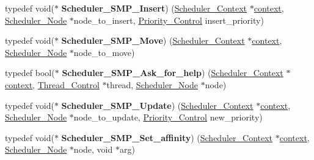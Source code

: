 \begin{DoxyCompactItemize}
typedef void($\ast$ {\bfseries Scheduler\+\_\+\+S\+M\+P\+\_\+\+Insert}) (\mbox{\hyperlink{structScheduler__Context}{Scheduler\+\_\+\+Context}} $\ast$\mbox{\hyperlink{sun4u_2tte_8h_a9b4a99475e2709333b8e5d70483173f1}{context}}, \mbox{\hyperlink{structScheduler__Node}{Scheduler\+\_\+\+Node}} $\ast$node\+\_\+to\+\_\+insert, \mbox{\hyperlink{group__RTEMSScorePriority_ga59d02b58072d31a9a1cfe644557aefe2}{Priority\+\_\+\+Control}} insert\+\_\+priority)
\item 
\mbox{\label{group__RTEMSScoreSchedulerSMP_gafd858381d71652bf4544edd5720ee9bb}} 
typedef void($\ast$ {\bfseries Scheduler\+\_\+\+S\+M\+P\+\_\+\+Move}) (\mbox{\hyperlink{structScheduler__Context}{Scheduler\+\_\+\+Context}} $\ast$\mbox{\hyperlink{sun4u_2tte_8h_a9b4a99475e2709333b8e5d70483173f1}{context}}, \mbox{\hyperlink{structScheduler__Node}{Scheduler\+\_\+\+Node}} $\ast$node\+\_\+to\+\_\+move)
\item 
\mbox{\label{group__RTEMSScoreSchedulerSMP_gab1c70b4d168f72f16900e2aa9deff2c6}} 
typedef bool($\ast$ {\bfseries Scheduler\+\_\+\+S\+M\+P\+\_\+\+Ask\+\_\+for\+\_\+help}) (\mbox{\hyperlink{structScheduler__Context}{Scheduler\+\_\+\+Context}} $\ast$\mbox{\hyperlink{sun4u_2tte_8h_a9b4a99475e2709333b8e5d70483173f1}{context}}, \mbox{\hyperlink{struct__Thread__Control}{Thread\+\_\+\+Control}} $\ast$thread, \mbox{\hyperlink{structScheduler__Node}{Scheduler\+\_\+\+Node}} $\ast$node)
\item 
\mbox{\label{group__RTEMSScoreSchedulerSMP_ga1521798609968da561928c34daeb8010}} 
typedef void($\ast$ {\bfseries Scheduler\+\_\+\+S\+M\+P\+\_\+\+Update}) (\mbox{\hyperlink{structScheduler__Context}{Scheduler\+\_\+\+Context}} $\ast$\mbox{\hyperlink{sun4u_2tte_8h_a9b4a99475e2709333b8e5d70483173f1}{context}}, \mbox{\hyperlink{structScheduler__Node}{Scheduler\+\_\+\+Node}} $\ast$node\+\_\+to\+\_\+update, \mbox{\hyperlink{group__RTEMSScorePriority_ga59d02b58072d31a9a1cfe644557aefe2}{Priority\+\_\+\+Control}} new\+\_\+priority)
\item 
\mbox{\label{group__RTEMSScoreSchedulerSMP_ga4bd9696c86228b495ea5569708e9850b}} 
typedef void($\ast$ {\bfseries Scheduler\+\_\+\+S\+M\+P\+\_\+\+Set\+\_\+affinity}) (\mbox{\hyperlink{structScheduler__Context}{Scheduler\+\_\+\+Context}} $\ast$\mbox{\hyperlink{sun4u_2tte_8h_a9b4a99475e2709333b8e5d70483173f1}{context}}, \mbox{\hyperlink{structScheduler__Node}{Scheduler\+\_\+\+Node}} $\ast$node, void $\ast$arg)

\end{DoxyCompactItemize}
